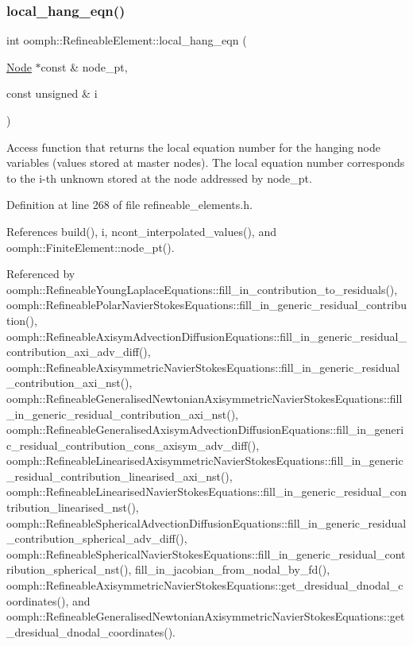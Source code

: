 \subsubsection{\texorpdfstring{local\+\_\+hang\+\_\+eqn()}{local\_hang\_eqn()}}
{\footnotesize\ttfamily int oomph\+::\+Refineable\+Element\+::local\+\_\+hang\+\_\+eqn (\begin{DoxyParamCaption}\item[{\hyperlink{classoomph_1_1Node}{Node} $\ast$const \&}]{node\+\_\+pt,  }\item[{const unsigned \&}]{i }\end{DoxyParamCaption})\hspace{0.3cm}{\ttfamily [inline]}}



Access function that returns the local equation number for the hanging node variables (values stored at master nodes). The local equation number corresponds to the i-\/th unknown stored at the node addressed by node\+\_\+pt. 



Definition at line 268 of file refineable\+\_\+elements.\+h.



References build(), i, ncont\+\_\+interpolated\+\_\+values(), and oomph\+::\+Finite\+Element\+::node\+\_\+pt().



Referenced by oomph\+::\+Refineable\+Young\+Laplace\+Equations\+::fill\+\_\+in\+\_\+contribution\+\_\+to\+\_\+residuals(), oomph\+::\+Refineable\+Polar\+Navier\+Stokes\+Equations\+::fill\+\_\+in\+\_\+generic\+\_\+residual\+\_\+contribution(), oomph\+::\+Refineable\+Axisym\+Advection\+Diffusion\+Equations\+::fill\+\_\+in\+\_\+generic\+\_\+residual\+\_\+contribution\+\_\+axi\+\_\+adv\+\_\+diff(), oomph\+::\+Refineable\+Axisymmetric\+Navier\+Stokes\+Equations\+::fill\+\_\+in\+\_\+generic\+\_\+residual\+\_\+contribution\+\_\+axi\+\_\+nst(), oomph\+::\+Refineable\+Generalised\+Newtonian\+Axisymmetric\+Navier\+Stokes\+Equations\+::fill\+\_\+in\+\_\+generic\+\_\+residual\+\_\+contribution\+\_\+axi\+\_\+nst(), oomph\+::\+Refineable\+Generalised\+Axisym\+Advection\+Diffusion\+Equations\+::fill\+\_\+in\+\_\+generic\+\_\+residual\+\_\+contribution\+\_\+cons\+\_\+axisym\+\_\+adv\+\_\+diff(), oomph\+::\+Refineable\+Linearised\+Axisymmetric\+Navier\+Stokes\+Equations\+::fill\+\_\+in\+\_\+generic\+\_\+residual\+\_\+contribution\+\_\+linearised\+\_\+axi\+\_\+nst(), oomph\+::\+Refineable\+Linearised\+Navier\+Stokes\+Equations\+::fill\+\_\+in\+\_\+generic\+\_\+residual\+\_\+contribution\+\_\+linearised\+\_\+nst(), oomph\+::\+Refineable\+Spherical\+Advection\+Diffusion\+Equations\+::fill\+\_\+in\+\_\+generic\+\_\+residual\+\_\+contribution\+\_\+spherical\+\_\+adv\+\_\+diff(), oomph\+::\+Refineable\+Spherical\+Navier\+Stokes\+Equations\+::fill\+\_\+in\+\_\+generic\+\_\+residual\+\_\+contribution\+\_\+spherical\+\_\+nst(), fill\+\_\+in\+\_\+jacobian\+\_\+from\+\_\+nodal\+\_\+by\+\_\+fd(), oomph\+::\+Refineable\+Axisymmetric\+Navier\+Stokes\+Equations\+::get\+\_\+dresidual\+\_\+dnodal\+\_\+coordinates(), and oomph\+::\+Refineable\+Generalised\+Newtonian\+Axisymmetric\+Navier\+Stokes\+Equations\+::get\+\_\+dresidual\+\_\+dnodal\+\_\+coordinates().

